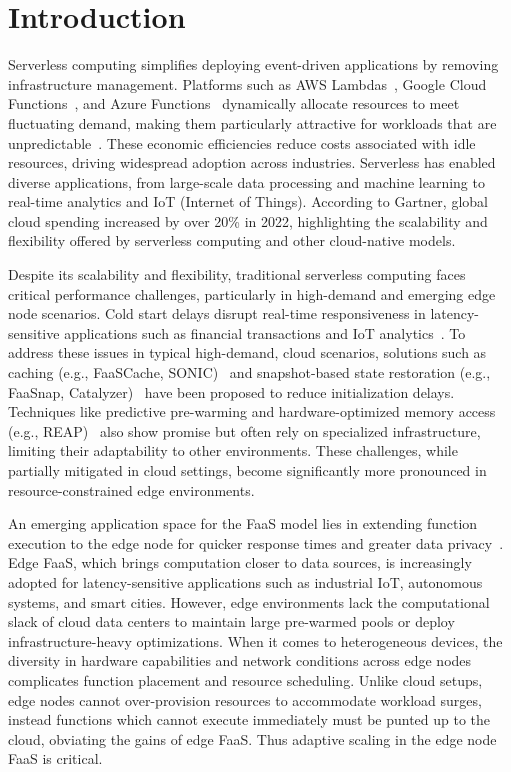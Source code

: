 \section{Introduction}\label{sec:intro}

Serverless computing simplifies deploying event-driven applications by removing infrastructure management. Platforms such as AWS Lambdas~\cite{aws_lambda_run_2024}, Google Cloud Functions~\cite{google_cloud_google_2024}, and Azure Functions~\cite{miscrosoft_ignite_azure_2023} dynamically allocate resources to meet fluctuating demand, making them particularly attractive for workloads that are unpredictable~\cite{ao_faasnet_2021,ustiugov_benchmarking_2021}. These economic efficiencies reduce costs associated with idle resources, driving widespread adoption across industries. Serverless has enabled diverse applications, from large-scale data processing and machine learning to real-time analytics and IoT (Internet of Things). According to Gartner, global cloud spending increased by over 20\% in 2022, highlighting the scalability and flexibility offered by serverless computing and other cloud-native models.

Despite its scalability and flexibility, traditional serverless computing faces critical performance challenges, particularly in high-demand and emerging edge node scenarios. Cold start delays disrupt real-time responsiveness in latency-sensitive applications such as financial transactions and IoT analytics~\cite{alexander_faascache_2021,ustiugov_benchmarking_2021}. To address these issues in typical high-demand, cloud scenarios, solutions such as caching (e.g., FaaSCache, SONIC)~\cite{ashraf_sonic_2021, alexander_faascache_2021} and snapshot-based state restoration (e.g., FaaSnap, Catalyzer)~\cite{ao_faasnap_2022, dong_catalyzer_2020} have been proposed to reduce initialization delays. Techniques like predictive pre-warming and hardware-optimized memory access (e.g., REAP)~\cite{ustiugov_benchmarking_2021} also show promise but often rely on specialized infrastructure, limiting their adaptability to other environments. These challenges, while partially mitigated in cloud settings, become significantly more pronounced in resource-constrained edge environments.

An emerging application space for the FaaS model lies in extending function execution to the edge node for quicker response times and greater data privacy~\cite{rausch_optimized_2021, xie_when_2021}. Edge FaaS, which brings computation closer to data sources, is increasingly adopted for latency-sensitive applications such as industrial IoT, autonomous systems, and smart cities. However, edge environments lack the computational slack of cloud data centers to maintain large pre-warmed pools or deploy infrastructure-heavy optimizations. When it comes to heterogeneous devices, the diversity in hardware capabilities and network conditions across edge nodes complicates function placement and resource scheduling. Unlike cloud setups, edge nodes cannot over-provision resources to accommodate workload surges, instead functions which cannot execute immediately must be punted up to the cloud, obviating the gains of edge FaaS. Thus adaptive scaling in the edge node FaaS is critical.



